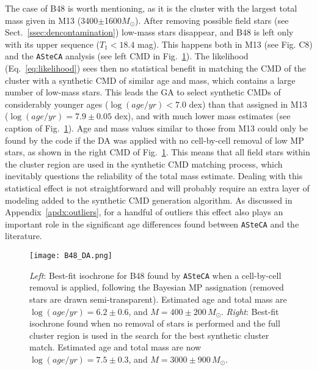 \documentclass{aa}
\begin{document}
The case of B48 is worth mentioning, as it is the cluster with the largest total
mass given in M13 (3400$\pm$1600$M_{\odot}$).
After removing possible field stars (see Sect.~\ref{ssec:dencontamination})
low-mass stars disappear, and B48 is left only with its upper sequence 
($T_1<18.4$ mag). This happens both in M13 (see Fig. C8) and the
\texttt{ASteCA} analysis (see left CMD in Fig.~\ref{fig:B48_DA}).
%
The likelihood (Eq.~\ref{eq:likelihood}) sees then no statistical benefit in
matching the CMD of the cluster with a synthetic CMD of similar age and mass,
which contains a large number of low-mass stars.
This leads the GA to select synthetic CMDs of considerably younger ages
($\log(age/yr){<}7.0$ dex) than that assigned in M13
($\log(age/yr){=}7.9\pm0.05$ dex), and with much lower mass estimates (see
caption of Fig.~\ref{fig:B48_DA}).
%
%
Age and mass values similar to those from M13 could  only be found by the code
if the DA was applied with no cell-by-cell removal of low MP stars, as shown in
the right CMD of Fig.~\ref{fig:B48_DA}. This means that all field stars within
the cluster region are used in the synthetic CMD matching process, which
inevitably questions the reliability of the total mass estimate.
%
Dealing with this statistical effect is not straightforward and will probably
require an extra layer of modeling added to the synthetic CMD generation
algorithm.
As discussed in Appendix~\ref{apdx:outliers}, for a handful of outliers this
effect also plays an important role in the significant age differences found
between \texttt{ASteCA}
and the literature.

\begin{figure}
\centering
\texttt{[image: B48\_DA.png]}
\caption{\emph{Left}: Best-fit isochrone for B48 found by \texttt{ASteCA} when
a cell-by-cell removal is applied, following the Bayesian MP assignation 
(removed stars are drawn semi-transparent). Estimated age and
total mass are $\log(age/yr){=}6.2{\pm}0.6$, and $M{=}400{\pm}200\,M_{\odot}$.
\emph{Right}: Best-fit isochrone found when no removal of stars is performed
and the full cluster region is used in the search for the best synthetic
cluster match. Estimated age and total mass are now
$\log(age/yr){=}7.5{\pm}0.3$, and $M{=}3000{\pm}900\,M_{\odot}$.}
\label{fig:B48_DA}
\end{figure}
\end{document}

